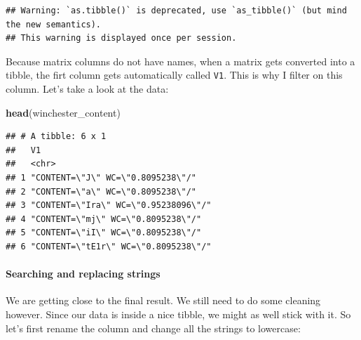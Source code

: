 \documentclass[]{gitbook}
\newenvironment{Shaded}{\begin{snugshade}}{\end{snugshade}}
\newcommand{\DataTypeTok}[1]{\textcolor[rgb]{0.13,0.29,0.53}{#1}}
\newcommand{\KeywordTok}[1]{\textcolor[rgb]{0.13,0.29,0.53}{\textbf{#1}}}
\newcommand{\NormalTok}[1]{#1}
\newcommand{\OperatorTok}[1]{\textcolor[rgb]{0.81,0.36,0.00}{\textbf{#1}}}
\newcommand{\StringTok}[1]{\textcolor[rgb]{0.31,0.60,0.02}{#1}}
\let\oldparagraph\paragraph
\renewcommand{\paragraph}[1]{\oldparagraph{#1}\mbox{}}
\begin{document}
\begin{Shaded}
\end{Shaded}

\begin{verbatim}
## Warning: `as.tibble()` is deprecated, use `as_tibble()` (but mind the new semantics).
## This warning is displayed once per session.
\end{verbatim}

Because matrix columns do not have names, when a matrix gets converted into a tibble, the firt column
gets automatically called \texttt{V1}. This is why I filter on this column. Let's take a look at the data:

\begin{Shaded}
\begin{Highlighting}[]
\KeywordTok{head}\NormalTok{(winchester_content)}
\end{Highlighting}
\end{Shaded}

\begin{verbatim}
## # A tibble: 6 x 1
##   V1                                  
##   <chr>                               
## 1 "CONTENT=\"J\" WC=\"0.8095238\"/"   
## 2 "CONTENT=\"a\" WC=\"0.8095238\"/"   
## 3 "CONTENT=\"Ira\" WC=\"0.95238096\"/"
## 4 "CONTENT=\"mj\" WC=\"0.8095238\"/"  
## 5 "CONTENT=\"iI\" WC=\"0.8095238\"/"  
## 6 "CONTENT=\"tE1r\" WC=\"0.8095238\"/"
\end{verbatim}

\hypertarget{searching-and-replacing-strings}{%
\paragraph{Searching and replacing strings}\label{searching-and-replacing-strings}}

We are getting close to the final result. We still need to do some cleaning however. Since our data
is inside a nice tibble, we might as well stick with it. So let's first rename the column and
change all the strings to lowercase:

\begin{Shaded}
\end{Shaded}
\end{document}
